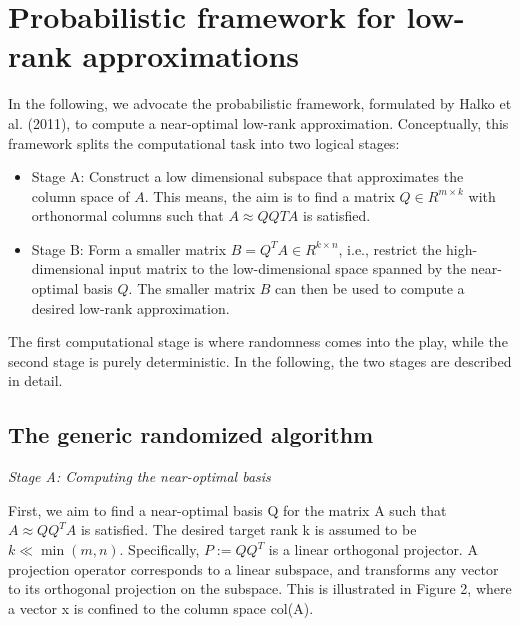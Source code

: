 \documentclass[a4paper,10pt]{article}
\begin{document}
\section{Probabilistic framework for low-rank approximations}
In the following, we advocate the probabilistic framework, formulated by Halko et al. (2011), to compute a near-optimal low-rank approximation. Conceptually, this framework splits the computational task into two logical stages:

\begin{itemize}
	\item Stage A: Construct a low dimensional subspace that approximates the column space of $A$. This means, the aim is to find a matrix $Q \in R^{m\times k}$ with orthonormal columns such that  $A\approx QQTA$ is satisfied.
	
	\item Stage B: Form a smaller matrix $B=Q^T A \in R^{k \times n}$, i.e., restrict the high-dimensional
	input matrix to the low-dimensional space spanned by the near-optimal basis $Q$. The
	smaller matrix $B$ can then be used to compute a desired low-rank approximation.
	
\end{itemize}

The first computational stage is where randomness comes into the play, while the second stage is  purely deterministic. In the following, the two stages are described in detail.

\subsection{The generic randomized algorithm}

\textit{Stage A: Computing the near-optimal basis} 

First, we aim to find a near-optimal basis Q for the matrix A such that $A \approx QQ^T A$ is satisfied. The desired target rank k is assumed to be $k \ll \min{(m, n)}$. Specifically, $P := QQ^T$ is a linear orthogonal projector. A projection operator corresponds to a linear subspace, and transforms any vector to its orthogonal projection on the subspace. This is illustrated in Figure 2, where a vector x is confined to the column space col(A).
\end{document}
